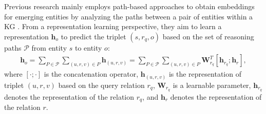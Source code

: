 \documentclass[sigconf]{acmart}
\begin{document}
Previous research mainly employs path-based approaches \cite{sadeghian2019drum, zhu2021neural} to obtain embeddings for emerging entities by analyzing the paths between a pair of entities within a KG \cite{wang2024large}. From a representation learning perspective, they aim to learn a representation $\mathbf{h}_{o}$ to predict the triplet $(s, r_q, o)$ based on the set of reasoning paths $\mathcal{P}$ from entity $s$ to entity $o$:
\vspace{-3pt}
\begin{equation}
\label{triple_embd}
\begin{aligned}
    \mathbf{h}_{o} = \sum_{P \in \mathcal{P}}\sum _{(u,r,v)\in P} \mathbf{h}_{(u,r,v)} = \sum_{P \in \mathcal{P}}\sum _{(u,r,v)\in P} \mathbf{W}_{r_q}^{T}[\mathbf{h}_{r_q};\mathbf{h}_{r}],
\end{aligned}
\end{equation}
where $[\cdot;\cdot]$ is the concatenation operator, $\mathbf{h}_{(u,r,v)}$ is the representation of triplet $(u, r, v)$  based on the query relation $r_q$, $\mathbf{W}_{r_q}$ is a learnable parameter, $\mathbf{h}_{r_q}$ denotes the representation of the relation $r_q$, and $\mathbf{h}_{r}$ denotes the representation of the relation $r$.

\end{document}

